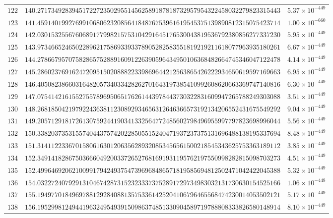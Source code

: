 \documentclass[12pt,reqno]{amsart}
\theoremstyle{remark}
\begin{document}
\begin{longtable}{clc}
$122$ & $140.2717349283945172272350295514562589187818732957954322458032279823315443$ & $5.37\times 10^{-449}$ \\
$123$ & $141.4591401992769910680623208564184876753961619545375139890812315075423714$ & $1.00\times 10^{-660}$ \\
$124$ & $142.0301532556760689177998215753104291645176530043819536792380856277337230$ & $5.95\times 10^{-449}$ \\
$125$ & $143.9734665246502289621758693393378905282583551819219211618077963935180261$ & $6.67\times 10^{-449}$ \\
$126$ & $144.2786679570758286575288916091226390596434950106368482664745346047122478$ & $4.14\times 10^{-449}$ \\
$127$ & $145.2860237691624720951502088822339869644212563865426222934650619597169663$ & $6.95\times 10^{-449}$ \\
$128$ & $146.4050823866031648205734033428262701643197385410992608620663369747140816$ & $6.30\times 10^{-449}$ \\
$129$ & $147.0754142161552755789695065176261443978443730322831609947265788249303088$ & $3.51\times 10^{-449}$ \\
$130$ & $148.2681850421979224363811230892934656312646366573192134206552431675549292$ & $9.04\times 10^{-449}$ \\
$131$ & $149.2057129181726130759244190341332564772485602798496955997797823698996044$ & $5.56\times 10^{-449}$ \\
$132$ & $150.3382037353155740443757420228505515240471937237375131696488138195337694$ & $8.48\times 10^{-449}$ \\
$133$ & $151.3141122336701580616301206356289320853456561500218545343625753363189112$ & $3.85\times 10^{-449}$ \\
$134$ & $152.3491418286750366604920033726527681691931195762197550998282815098703273$ & $4.51\times 10^{-449}$ \\
$135$ & $152.4996469206210099179424937547396968486571819585694812502471042422045388$ & $5.32\times 10^{-449}$ \\
$136$ & $154.0322724079291310467428731523233373752891729734983032131730630154525166$ & $1.06\times 10^{-448}$ \\
$137$ & $155.1949770184969788129284088135753361425204106796465568474230014053502121$ & $5.17\times 10^{-449}$ \\
$138$ & $156.1952998124944196324954939150986374851330904589719788808333826580148914$ & $8.10\times 10^{-449}$ \\

\end{longtable}
\end{document}
